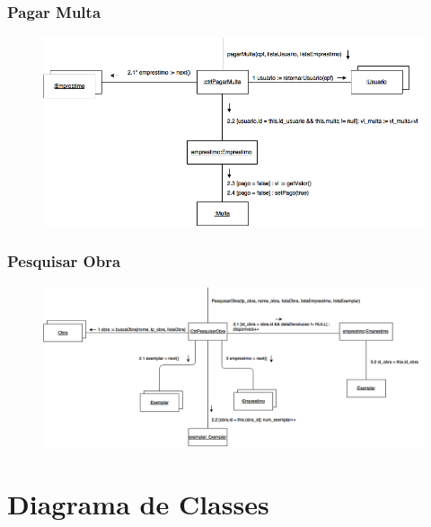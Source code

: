 \documentclass[
	12pt,				%
	openright,			%
	oneside,			%
	a4paper,			%
	english,			%
	brazil				%
	]{abntex2}
\begin{document}
\subsection{Pagar Multa}

\begin{figure}[H]
\includegraphics[width=1\textwidth]{PagarMulta}
\label{fig:figura7}
\end{figure}

\subsection{Pesquisar Obra}

\begin{figure}[H]
\includegraphics[width=1\textwidth]{PesquisarObra}
\label{fig:figura8}
\end{figure}


\chapter{Diagrama de Classes}
\end{document}
